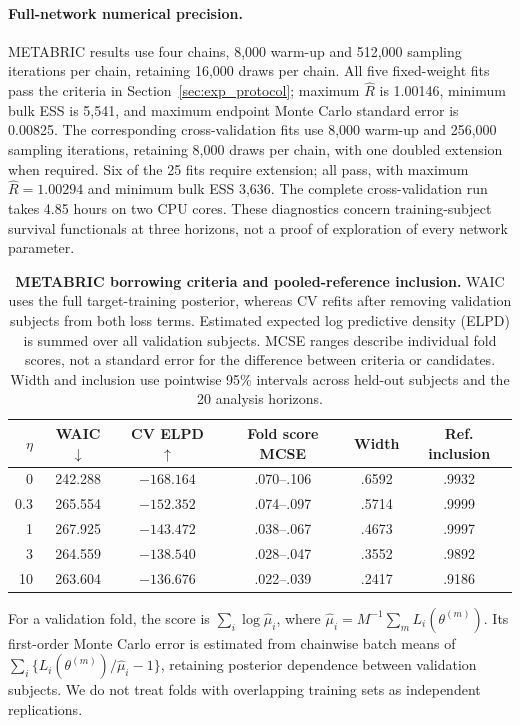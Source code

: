 \documentclass{article} %
\begin{document}
\paragraph{Full-network numerical precision.}
METABRIC results use four chains, 8,000 warm-up and 512,000 sampling iterations per chain, retaining 16,000 draws per chain. All five fixed-weight fits pass the criteria in Section~\ref{sec:exp_protocol}; maximum $\widehat R$ is 1.00146, minimum bulk ESS is 5,541, and maximum endpoint Monte Carlo standard error is 0.00825. The corresponding cross-validation fits use 8,000 warm-up and 256,000 sampling iterations, retaining 8,000 draws per chain, with one doubled extension when required. Six of the 25 fits require extension; all pass, with maximum $\widehat R=1.00294$ and minimum bulk ESS 3,636. The complete cross-validation run takes 4.85 hours on two CPU cores. These diagnostics concern training-subject survival functionals at three horizons, not a proof of exploration of every network parameter.

\begin{table}[htbp]
\centering\footnotesize
\caption{\textbf{METABRIC borrowing criteria and pooled-reference inclusion.} WAIC uses the full target-training posterior, whereas CV refits after removing validation subjects from both loss terms. Estimated expected log predictive density (ELPD) is summed over all validation subjects. MCSE ranges describe individual fold scores, not a standard error for the difference between criteria or candidates. Width and inclusion use pointwise 95\% intervals across held-out subjects and the 20 analysis horizons.}
\label{tab:real-selection}
\setlength{\tabcolsep}{5pt}
\begin{tabular}{@{}rccccc@{}}
\toprule
$\eta$ & WAIC $\downarrow$ & CV ELPD $\uparrow$ & Fold score MCSE & Width & Ref. inclusion\\
\midrule
0 & 242.288 & $-168.164$ & .070--.106 & .6592 & .9932\\
0.3 & 265.554 & $-152.352$ & .074--.097 & .5714 & .9999\\
1 & 267.925 & $-143.472$ & .038--.067 & .4673 & .9997\\
3 & 264.559 & $-138.540$ & .028--.047 & .3552 & .9892\\
10 & 263.604 & $-136.676$ & .022--.039 & .2417 & .9186\\
\bottomrule
\end{tabular}
\end{table}

For a validation fold, the score is $\sum_i\log\widehat\mu_i$, where $\widehat\mu_i=M^{-1}\sum_m L_i(\theta^{(m)})$. Its first-order Monte Carlo error is estimated from chainwise batch means of $\sum_i\{L_i(\theta^{(m)})/\widehat\mu_i-1\}$, retaining posterior dependence between validation subjects. We do not treat folds with overlapping training sets as independent replications.
\end{document}

